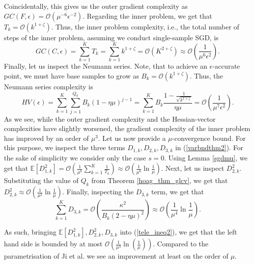 \documentclass[11pt, twoside]{report}
\begin{document}
Coincidentally, this gives us the outer gradient complexity as $GC(F,\epsilon) = \mathcal{O}(\mu^{-6}\epsilon^{-2})$.
Regarding the inner problem, we get that $T_k = \mathcal{O}\left(k^{1+\zeta}\right)$. Thus, the inner problem complexity, i.e., the total number of steps of the inner problem, assuming we conduct single-sample SGD, is
\[GC(C,\epsilon) = \sum_{k=1}^K T_k = \sum_{k=1}^{K} k^{1+\zeta} = \mathcal{O}(K^{2+\zeta}) \approx \mathcal{O} \left(\frac{1}{\mu^6 \epsilon^2}\right).\]
Finally, let us inspect the Neumann series. Note, that to achieve an $\epsilon$-accurate point, we must have base samples to grow as $B_k = \mathcal{O} \left( k^{1+\zeta} \right)$. Thus, the Neumann series complexity is
\[HV(\epsilon) = \sum_{k=1}^K \sum_{j=1}^{Q_k} B_k (1-\eta\mu)^{j-1}=\sum_{k=1}^K B_k \frac{1 - \frac{1}{\sqrt{k^{1+\zeta}}}}{\eta\mu} = \mathcal{O}\left(\frac{1}{\mu^7 \epsilon^2} \right).\]
As we see, while the outer gradient complexity and the Hessian-vector complexities have slightly worsened, the gradient complexity of the inner problem has improved by an order of $\mu^3$. Let us now provide a $\mu$-convergence bound. For this purpose, we inspect the three terms $D_{1,k}, D_{2,k}, D_{3,k}$ in (\ref{varbndthm2}). For the sake of simplicity we consider only the case $s=0$. Using Lemma \ref{sgdmu}, we get that $\mathbb{E} [D_{1,k}^2] = \mathcal{O}\left(\frac{1}{\mu^6}\sum_{k=1}^K\frac{1}{T_k}\right) \approx \mathcal{O}\left(\frac{1}{\mu^6}\ln{\frac{1}{\mu}}\right)$. Next, let us inspect $D_{2,k}^2$. Substituting the value of $Q_k$ from Theorem \ref{hoag_thm_glcv}, we get that $D_{2,k}^2 \approx \mathcal{O} \left( \frac{1}{\mu^2} \ln{\frac{1}{\mu}}\right)$. Finally, inspecting the $D_{3,k}$ term, we get that
\[\sum^{K}_{k=1} D_{3,k} = \mathcal{O}\left( \frac{\kappa^2}{B_k (2 - \eta \mu)^2} \right) \approx \mathcal{O}\left( \frac{1}{\mu^4} \ln{\frac{1}{\mu}} \right).\]

As such, bringing $\mathbb{E} [D_{1,k}^2], D_{2,k}^2, D_{3,k}$ into (\ref{tele_ineq2}), we get that the left hand side is bounded by at most $\mathcal{O}\left( \frac{1}{\mu^3} \ln{\left( \frac{1}{\mu} \right)} \right)$. Compared to the parametrisation of Ji et al. we see an improvement at least on the order of $\mu$.
\end{document}
